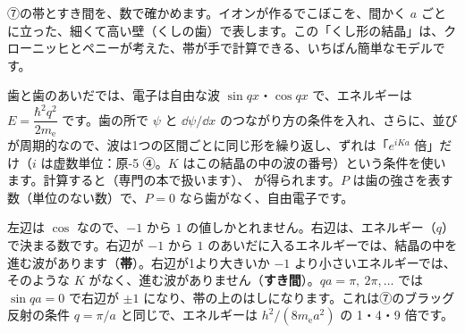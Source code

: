 \label{ph:原-8:sec11}
⑦の帯とすき間を、数で確かめます。イオンが作るでこぼこを、間かく $a$ ごとに立った、細くて高い壁（くしの歯）で表します。この「くし形の結晶」は、クローニッヒとペニーが考えた、帯が手で計算できる、いちばん簡単なモデルです。
\begin{phmodel}
\end{phmodel}

歯と歯のあいだでは、電子は自由な波 $\sin qx$・$\cos qx$ で、エネルギーは $E=\dfrac{\hbar^2q^2}{2m_{\mathrm e}}$ です。歯の所で $\psi$ と $\dd\psi/\dd x$ のつながり方の条件を入れ、さらに、並びが周期的なので、波は1つの区間ごとに同じ形を繰り返し、ずれは「$e^{iKa}$ 倍」だけ（$i$ は虚数単位：原-5 ④。$K$ はこの結晶の中の波の番号）という条件を使います。計算すると（専門の本で扱います）、
\label{ph:原-8:KP}が得られます。$P$ は歯の強さを表す数（単位のない数）で、$P=0$ なら歯がなく、自由電子です。

\begin{phyomi}[$\cos Ka=\cos qa+P\,\dfrac{\sin qa}{qa}$]
左辺は $\cos$ なので、$-1$ から $1$ の値しかとれません。右辺は、エネルギー（$q$）で決まる数です。右辺が $-1$ から $1$ のあいだに入るエネルギーでは、結晶の中を進む波があります（\textbf{帯}）。右辺が1より大きいか $-1$ より小さいエネルギーでは、そのような $K$ がなく、進む波がありません（\textbf{すき間}）。$qa=\pi,\ 2\pi,\ldots$ では $\sin qa=0$ で右辺が $\pm1$ になり、帯の上のはしになります。これは⑦のブラッグ反射の条件 $q=\pi/a$ と同じで、エネルギーは $h^2/(8m_{\mathrm e}a^2)$ の 1・4・9 倍です。
\end{phyomi}

